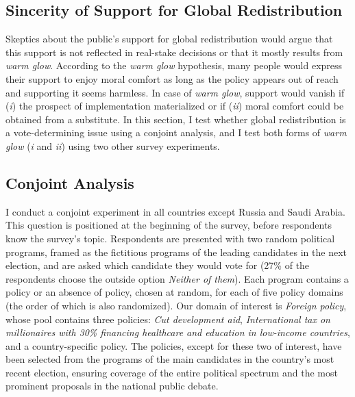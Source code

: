 \documentclass[12pt,english]{article}
\begin{document}
\begin{bibunit}
\section{Sincerity of Support for Global Redistribution\label{sec:sincerity}}

Skeptics about the public's support for global redistribution would argue that this support is not reflected in real-stake decisions or that it mostly results from \textit{warm glow}. According to the \textit{warm glow} hypothesis, many people would express their support to enjoy moral comfort as long as the policy appears out of reach and supporting it seems harmless. In case of \textit{warm glow}, support would vanish if (\textit{i}) the prospect of implementation materialized or if (\textit{ii}) moral comfort could be obtained from a substitute. In this section, I test whether global redistribution is a vote-determining issue using a conjoint analysis, and I test both forms of \textit{warm glow} (\textit{i} and \textit{ii}) using two other survey experiments.

\subsection{Conjoint Analysis}\label{subsec:conjoint}

I conduct a conjoint experiment in all countries except Russia and Saudi Arabia. This question is positioned at the beginning of the survey, before respondents know the survey's topic. Respondents are presented with two random political programs, framed as the fictitious programs of the leading candidates in the next election, and are asked which candidate they would vote for (27\% of the respondents choose the outside option \textit{Neither of them}). Each program contains a policy or an absence of policy, chosen at random, for each of five policy domains (the order of which is also randomized). %
Our domain of interest is \textit{Foreign policy}, whose pool contains three policies: \textit{Cut development aid}, \textit{International tax on millionaires with 30\% financing healthcare and education in low-income countries}, and a country-specific policy. %
The policies, except for these two of interest, have been selected from the programs of the main candidates in the country's most recent election, ensuring coverage of the entire political spectrum and the most prominent proposals in the national public debate. 


\end{bibunit}
\end{document}
